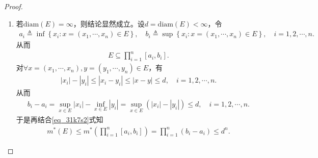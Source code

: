 \documentclass[../../main.tex]{subfiles}%
\begin{document}
\begin{proof}
\begin{enumerate}[(1)]
\item 若$\mathrm{diam}(E)=\infty$，则结论显然成立。设$d=\mathrm{diam}(E)<\infty$，令
\begin{align*}
a_i\triangleq \inf\limits\left\{ x_i:x=(x_1,\cdots,x_n)\in E \right\},\quad b_i\triangleq \sup\limits\left\{ x_i:x=(x_1,\cdots,x_n)\in E \right\},\quad i=1,2,\cdots,n.
\end{align*}
从而
\begin{align}\label{eq_31k7s2}
E\subseteq \prod\limits_{i=1}^n\left[ a_i,b_i \right].
\end{align}
对$\forall x=(x_1,\cdots,x_n),y=(y_1,\cdots,y_n)\in E$，有
\begin{align*}
|x_i|-|y_i|\leqslant |x_i-y_i|\leqslant |x-y|\leqslant d,\quad i=1,2,\cdots,n.
\end{align*}
从而
\begin{align*}
b_i-a_i=\sup\limits_{x\in E}|x_i|-\inf\limits_{x\in E}|y_i|=\sup\limits_{x\in E}\left( |x_i|-|y_i| \right) \leqslant d,\quad i=1,2,\cdots,n.
\end{align*}
于是再结合\eqref{eq_31k7s2}式知
\begin{align*}
m^*(E) \leqslant m^*\left( \prod\limits_{i=1}^n\left[ a_i,b_i \right] \right) =\prod\limits_{i=1}^n (b_i-a_i) \leqslant d^n.
\end{align*}
\end{enumerate}
\end{proof}
\end{document}
